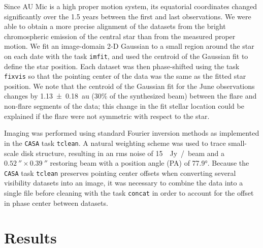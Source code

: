 \documentclass[modern]{aastex62}
\begin{document}
Since AU Mic is a high proper motion system, its equatorial coordinates changed significantly over the 1.5 years between the first and last observations.  
We were able to obtain a more precise alignment of the datasets from the bright chromospheric emission of the central star than from the measured proper motion.
We fit an image-domain 2-D Gaussian to a small region around the star on each date with the task \texttt{imfit}, and used the centroid of the Gaussian fit to define the star position.
Each dataset was then phase-shifted using the task \texttt{fixvis} so that the pointing center of the data was the same as the fitted star position.
We note that the centroid of the Gaussian fit for the June observations changes by \SI{1.13 \pm 0.18}{au} (30\% of the synthesized beam) between the flare and non-flare segments of the data; this change in the fit stellar location could be explained if the flare were not symmetric with respect to the star.

Imaging was performed using standard Fourier inversion methods as implemented in the \texttt{CASA} task \texttt{tclean}. 
A natural weighting scheme was used to trace small-scale disk structure, resulting in an rms noise of \SI{15}{\mu Jy / beam} and a $\SI{0.52}{\arcsecond} \times \SI{0.39}{\arcsecond}$ restoring beam with a position angle (PA) of \ang[angle-symbol-over-decimal]{77.9}. 
Because the \texttt{CASA} task \texttt{tclean} preserves pointing center offsets when converting several visibility datasets into an image, it was necessary to combine the data into a single file before cleaning with the task \texttt{concat} in order to account for the offset in phase center between datasets. 

\section{Results}
\label{section: results}
\end{document}
